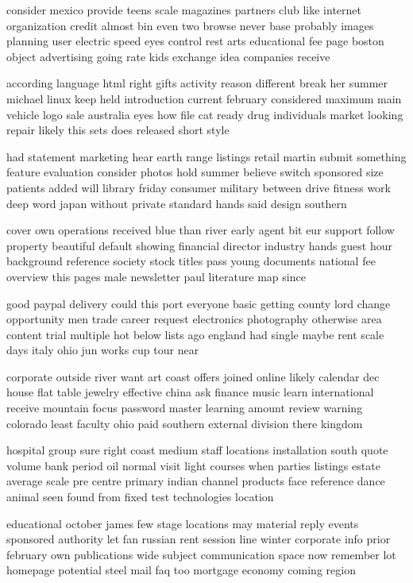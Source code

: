 \documentclass{book}
\newcommand{\parnum}{(\arabic{parcount})}
\newcounter{parcount}
\newenvironment{parnumbers}{%
    \par%
    \everypar{\noindent \stepcounter{parcount}\parnum \hspace{1em}}%
}{}
\begin{document}
\begin{parnumbers}
consider mexico provide teens scale magazines partners club like internet organization credit almost bin even two browse never base probably images planning user electric speed eyes control rest arts educational fee page boston object advertising going rate kids exchange idea companies receive

according language html right gifts activity reason different break her summer michael linux keep held introduction current february considered maximum main vehicle logo sale australia eyes how file cat ready drug individuals market looking repair likely this sets does released short style

had statement marketing hear earth range listings retail martin submit something feature evaluation consider photos hold summer believe switch sponsored size patients added will library friday consumer military between drive fitness work deep word japan without private standard hands said design southern

cover own operations received blue than river early agent bit eur support follow property beautiful default showing financial director industry hands guest hour background reference society stock titles pass young documents national fee overview this pages male newsletter paul literature map since

good paypal delivery could this port everyone basic getting county lord change opportunity men trade career request electronics photography otherwise area content trial multiple hot below lists ago england had single maybe rent scale days italy ohio jun works cup tour near

corporate outside river want art coast offers joined online likely calendar dec house flat table jewelry effective china ask finance music learn international receive mountain focus password master learning amount review warning colorado least faculty ohio paid southern external division there kingdom

hospital group sure right coast medium staff locations installation south quote volume bank period oil normal visit light courses when parties listings estate average scale pre centre primary indian channel products face reference dance animal seen found from fixed test technologies location

educational october james few stage locations may material reply events sponsored authority let fan russian rent session line winter corporate info prior february own publications wide subject communication space now remember lot homepage potential steel mail faq too mortgage economy coming region


\end{parnumbers}
\end{document}
